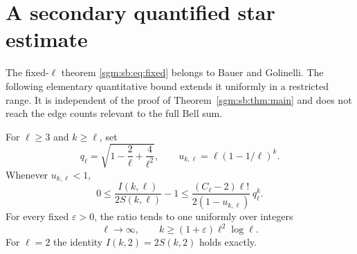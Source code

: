 \documentclass[11pt,letterpaper]{article}
\theoremstyle{remark}\newtheorem{remark}[theorem]{Remark}
\theoremstyle{definition}\newtheorem{definition}[theorem]{Definition}
\begin{document}
\section{A secondary quantified star estimate}\label{sgm:sb:sec:star}
The fixed-$\ell$ theorem \eqref{sgm:sb:eq:fixed} belongs to Bauer and Golinelli. The following elementary quantitative bound extends it uniformly in a restricted range. It is independent of the proof of Theorem~\ref{sgm:sb:thm:main} and does not reach the edge counts relevant to the full Bell sum.

\begin{proposition}\label{sgm:sb:prop:uniform}
For $\ell\ge3$ and $k\ge\ell$, set
\[
 q_\ell=\sqrt{1-\frac2\ell+\frac4{\ell^2}},
 \qquad u_{k,\ell}=\ell(1-1/\ell)^k.
\]
Whenever $u_{k,\ell}<1$,
\begin{equation}\label{sgm:sb:eq:uniform}
 0\le\frac{I(k,\ell)}{2S(k,\ell)}-1
 \le\frac{(C_\ell-2)\ell!}{2(1-u_{k,\ell})}\,q_\ell^k.
\end{equation}
For every fixed $\varepsilon>0$, the ratio tends to one uniformly over integers
\begin{equation}\label{sgm:sb:eq:uniformrange}
 \ell\to\infty,\qquad k\ge(1+\varepsilon)\ell^2\log\ell.
\end{equation}
For $\ell=2$ the identity $I(k,2)=2S(k,2)$ holds exactly.
\end{proposition}
\end{document}
